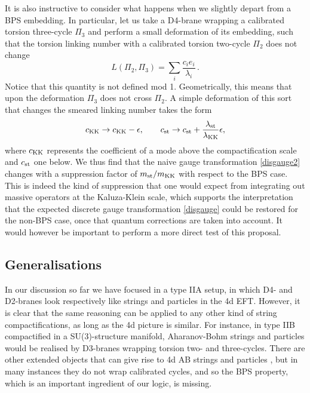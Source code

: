 \documentclass[11pt]{article}
\def\be{\begin{equation}}
\def\ee{\end{equation}}
\def\eps{{\epsilon}}
\begin{document}
It is also instructive to consider what happens when we slightly depart from a BPS embedding. In particular, let us take a D4-brane wrapping a calibrated torsion three-cycle $\Pi_3$ and perform a small deformation of its embedding, such that the torsion linking number with a calibrated torsion two-cycle $\Pi_2$  does not change
\be
L( \Pi_{2},\Pi_3) = \sum_i \frac{c_ie_i}{\lambda_i}  \, .
\label{Labs}
\ee
Notice that this quantity is not defined mod 1. Geometrically, this means that upon the deformation $\Pi_3$ does not cross $\Pi_2$. A simple deformation of this sort that changes the smeared linking number takes the form 
\be
c_{\rm KK} \to c_{\rm KK} - \eps , \qquad c_{\rm st} \to c_{\rm st} + \frac{\lambda_{\rm st}}{\lambda_{\rm KK}} \eps ,
\label{shiftKK}
\ee
where $c_{\rm KK}$ represents the coefficient of a mode above the compactification scale and $c_{\rm st}$ one below. We thus find that the naive gauge transformation \eqref{disgauge2} changes with a suppression factor of  $m_{\rm st}/m_{\rm KK}$ with respect to the BPS case. This is indeed the kind of suppression that one would expect from integrating out massive operators at the Kaluza-Klein scale, which supports the interpretation that the expected discrete gauge transformation \eqref{disgauge} could be restored for the non-BPS case, once that quantum corrections are taken into account. It would however be important to perform a more direct test of this proposal. 


\subsection{Generalisations}

In our discussion so far we have focused in a type IIA setup, in which D4- and D2-branes look respectively like strings and particles in the 4d EFT. However, it is clear that the same reasoning can be applied to any other kind of string compactifications, as long as the 4d picture is similar. For instance, in type IIB compactified in a SU(3)-structure manifold, Aharanov-Bohm strings and particles would be realised by D3-branes wrapping torsion two- and three-cycles. There are other extended objects that can give rise to 4d AB strings and particles \cite{Camara:2011jg}, but in many instances they do not wrap calibrated cycles, and so the BPS property, which is an important ingredient of our logic, is missing.
\end{document}
